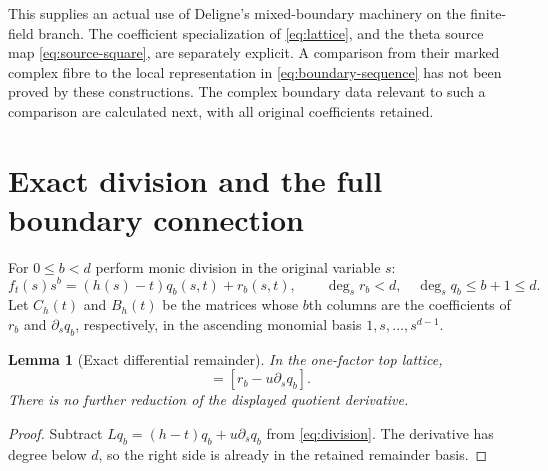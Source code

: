 \documentclass[11pt]{article}
\newtheorem{lemma}[theorem]{Lemma}
\begin{document}
This supplies an actual use of Deligne's mixed-boundary machinery on
the finite-field branch.  The coefficient specialization of
\eqref{eq:lattice}, and the theta source map
\eqref{eq:source-square}, are separately explicit.  A comparison from
their marked complex fibre to the local representation in
\eqref{eq:boundary-sequence} has not been proved by these constructions.
The complex boundary data relevant to such a comparison are calculated
next, with all original coefficients retained.

\section{Exact division and the full boundary connection}

For $0\le b<d$ perform monic division in the original variable $s$:
\begin{equation}
 f_t(s)s^b=(h(s)-t)q_b(s,t)+r_b(s,t),\qquad
 \deg_s r_b<d,\quad \deg_s q_b\le b+1\le d.
 \label{eq:division}
\end{equation}
Let $C_h(t)$ and $B_h(t)$ be the matrices whose $b$th columns are the
coefficients of $r_b$ and $\partial_s q_b$, respectively, in the
ascending monomial basis $1,s,\ldots,s^{d-1}$.

\begin{lemma}[Exact differential remainder]
In the one-factor top lattice,
\begin{equation}
 [f_t s^b]=[r_b-u\partial_s q_b].
 \label{eq:reduction}
\end{equation}
There is no further reduction of the displayed quotient derivative.
\end{lemma}
\begin{proof}
Subtract $Lq_b=(h-t)q_b+u\partial_s q_b$ from
\eqref{eq:division}.  The derivative has degree below $d$, so the
right side is already in the retained remainder basis.
\end{proof}
\end{document}
